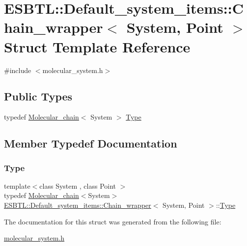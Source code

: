 \hypertarget{structESBTL_1_1Default__system__items_1_1Chain__wrapper}{}\section{E\+S\+B\+TL\+:\+:Default\+\_\+system\+\_\+items\+:\+:Chain\+\_\+wrapper$<$ System, Point $>$ Struct Template Reference}
\label{structESBTL_1_1Default__system__items_1_1Chain__wrapper}


{\ttfamily \#include $<$molecular\+\_\+system.\+h$>$}

\subsection*{Public Types}
\begin{DoxyCompactItemize}
\item 
typedef \hyperlink{classESBTL_1_1Molecular__chain}{Molecular\+\_\+chain}$<$ System $>$ \hyperlink{structESBTL_1_1Default__system__items_1_1Chain__wrapper_a4cb2f7c67fd8cdddefca890bbf5a49f2}{Type}
\end{DoxyCompactItemize}


\subsection{Member Typedef Documentation}
\mbox{\label{structESBTL_1_1Default__system__items_1_1Chain__wrapper_a4cb2f7c67fd8cdddefca890bbf5a49f2}} 
\subsubsection{\texorpdfstring{Type}{Type}}
{\footnotesize\ttfamily template$<$class System , class Point $>$ \\
typedef \hyperlink{classESBTL_1_1Molecular__chain}{Molecular\+\_\+chain}$<$System$>$ \hyperlink{structESBTL_1_1Default__system__items_1_1Chain__wrapper}{E\+S\+B\+T\+L\+::\+Default\+\_\+system\+\_\+items\+::\+Chain\+\_\+wrapper}$<$ System, Point $>$\+::\hyperlink{structESBTL_1_1Default__system__items_1_1Chain__wrapper_a4cb2f7c67fd8cdddefca890bbf5a49f2}{Type}}



The documentation for this struct was generated from the following file\+:\begin{DoxyCompactItemize}
\item 
\hyperlink{molecular__system_8h}{molecular\+\_\+system.\+h}\end{DoxyCompactItemize}
